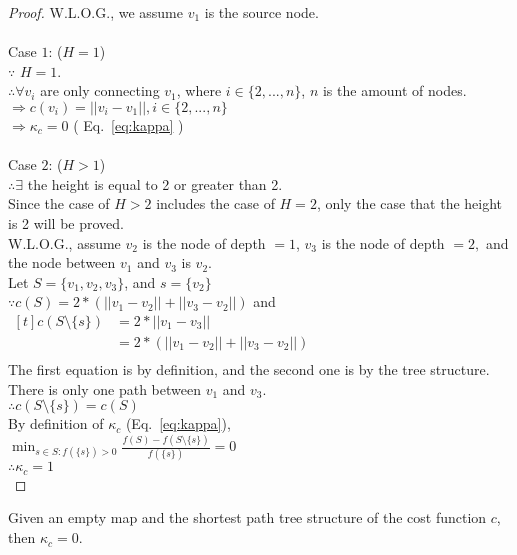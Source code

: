\begin{proof}

W.L.O.G., we assume $v_1$ is the source node.\\
\\
Case $1$: ($H=1$)\\
$\because$ $H=1$. \\
$\therefore\forall v_i$ are only connecting $v_1$, where $i\in\{2,...,n\}$, $n$ is the amount of nodes.\\
$\Rightarrow c(v_i) = ||v_i-v_1||, i \in \{2,...,n\}$ \\
$\Rightarrow \kappa_c = 0$ ( Eq.~\ref{eq:kappa} )\\
\\
Case $2$: ($H> 1$)\\
$\therefore \exists$ the height is equal to 2 or greater than 2. \\
Since the case of $H>2$ includes the case of $H=2$,
only the case that the height is 2 will be proved.\\
W.L.O.G., assume $v_2$ is the node of depth $= 1$, $v_3$ is the node of depth $= 2,$ and the node between $v_1$ and $v_3$ is $v_2$. \\
Let $S=\{v_1, v_2, v_3\}$, and $s = \{v_2 \}$ \\
$\because c(S) = 2*(||v_1-v_2||+||v_3-v_2||)$ and \\
$\begin{aligned}[t]
    c(S\setminus\{s\}) &= 2*||v_1-v_3|| \\
      &= 2*(||v_1-v_2||+||v_3-v_2||) \\
\end{aligned}$
\\
The first equation is by definition, and the second one is by the tree structure. \\ There is only one path between $v_1$ and $v_3.$\\
$\therefore c(S\setminus\{s\}) = c(S)$ \\
By definition of $\kappa_c$ (Eq.~\ref{eq:kappa}), \\
$\min_{s\in S:f(\{ s \}) > 0}\frac{f(S)-f(S\setminus\{ s\})}{f(\{s\})} = 0$\\
$\therefore \kappa_c = 1$ \\


\end{proof}

\begin{theorem} 
Given an empty map and the shortest path tree structure of the cost function $c$, then $\kappa_c = 0$.
\label{thm:spt}
\end{theorem}


